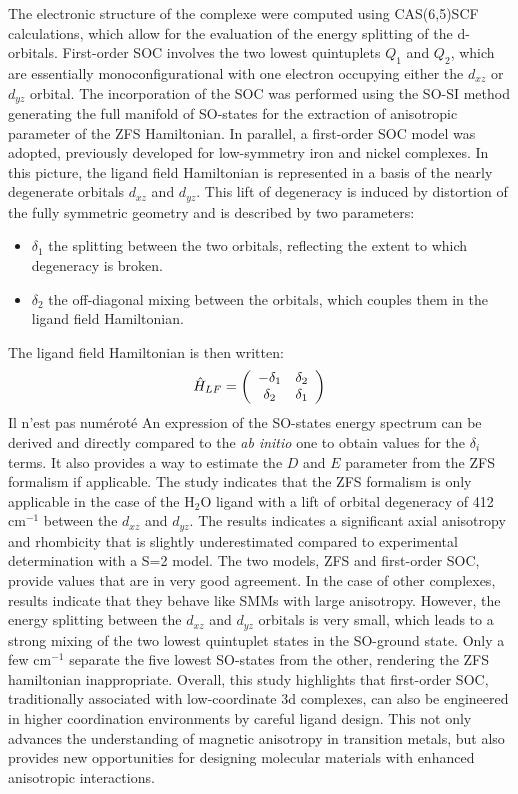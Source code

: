 \documentclass[12pt,a4paper]{report}
\numberwithin{equation}{section}
\begin{document}
The electronic structure of the complexe were computed using CAS(6,5)SCF calculations, which allow for the evaluation of the energy splitting of the d-orbitals.
First-order SOC involves the two lowest quintuplets $Q_1$ and $Q_2$, which are essentially monoconfigurational with one electron occupying either the $d_{xz}$ or $d_{yz}$ orbital.
The incorporation of the SOC was performed using the SO-SI method generating the full manifold of SO-states for the extraction of anisotropic parameter of the ZFS Hamiltonian.
In parallel, a first-order SOC model was adopted, previously developed for low-symmetry iron\cite{atanasov_detailed_2011} and nickel complexes\cite{ruamps_giant_2013}.
In this picture, the ligand field Hamiltonian is represented in a basis of the nearly degenerate orbitals $d_{xz}$ and $d_{yz}$.
This lift of degeneracy is induced by distortion of the fully symmetric geometry and is described by two parameters:

\begin{itemize}
    \item $\delta_1$ the splitting between the two orbitals, reflecting the extent to which degeneracy is broken.
    \item $\delta_2$ the off-diagonal mixing between the orbitals, which couples them in the ligand field Hamiltonian.
\end{itemize}

The ligand field Hamiltonian is then written:
\[ \hat{H}_{LF}= \left( \begin{array}{c c}
    -\delta_1 & \delta_2 \\
    \delta_2& \delta_1
    \end{array} \right)
\]
Il n'est pas numéroté
An expression of the SO-states energy spectrum can be derived and directly compared to the \textit{ab initio} one to obtain values for the $\delta_i$ terms.
It also provides a way to estimate the $D$ and $E$ parameter from the ZFS formalism if applicable.
The study indicates that the ZFS formalism is only applicable in the case of the H$_2$O ligand with a lift of orbital degeneracy of 412 cm$^{-1}$ between the $d_{xz}$ and $d_{yz}$.
The results indicates a significant axial anisotropy and rhombicity that is slightly underestimated compared to experimental determination with a S=2 model.
The two models, ZFS and first-order SOC, provide values that are in very good agreement.
In the case of other complexes, results indicate that they behave like SMMs with large anisotropy.
However, the energy splitting between the $d_{xz}$ and $d_{yz}$ orbitals is very small, which leads to a strong mixing of the two lowest quintuplet states in the SO-ground state.
Only a few cm$^{-1}$ separate the five lowest SO-states from the other, rendering the ZFS hamiltonian inappropriate.
Overall, this study highlights that first-order SOC, traditionally associated with low-coordinate 3d complexes, can also be engineered in higher coordination environments by careful ligand design.
This not only advances the understanding of magnetic anisotropy in transition metals, but also provides new opportunities for designing molecular materials with enhanced anisotropic interactions.
\end{document}
